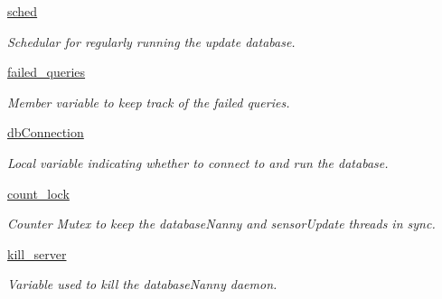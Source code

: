 \begin{DoxyCompactItemize}
\mbox{\label{class_server_app_1_1_server_app_ac135cf1405ae7df3699a2131821af81f}} 
\mbox{\hyperlink{class_server_app_1_1_server_app_ac135cf1405ae7df3699a2131821af81f}{sched}}
\begin{DoxyCompactList}\small\item\em Schedular for regularly running the update database. \end{DoxyCompactList}\item 
\mbox{\label{class_server_app_1_1_server_app_a392a723730fcdbefd0a4b96f820c9fec}} 
\mbox{\hyperlink{class_server_app_1_1_server_app_a392a723730fcdbefd0a4b96f820c9fec}{failed\+\_\+queries}}
\begin{DoxyCompactList}\small\item\em Member variable to keep track of the failed queries. \end{DoxyCompactList}\item 
\mbox{\hyperlink{class_server_app_1_1_server_app_a541e00ca3089461e9ee7f02b3a1fdea9}{db\+Connection}}
\begin{DoxyCompactList}\small\item\em Local variable indicating whether to connect to and run the database. \end{DoxyCompactList}\item 
\mbox{\label{class_server_app_1_1_server_app_a9749427986bfbdb2428bf5861b61f8c2}} 
\mbox{\hyperlink{class_server_app_1_1_server_app_a9749427986bfbdb2428bf5861b61f8c2}{count\+\_\+lock}}
\begin{DoxyCompactList}\small\item\em Counter Mutex to keep the database\+Nanny and sensor\+Update threads in sync. \end{DoxyCompactList}\item 
\mbox{\label{class_server_app_1_1_server_app_a5a9788c6453de0cb4cfc6a1f82cfa4d1}} 
\mbox{\hyperlink{class_server_app_1_1_server_app_a5a9788c6453de0cb4cfc6a1f82cfa4d1}{kill\+\_\+server}}
\begin{DoxyCompactList}\small\item\em Variable used to kill the database\+Nanny daemon. \end{DoxyCompactList}\item 
\mbox{\label{class_server_app_1_1_server_app_a108fcfaa44a437b4a2a8fede99da06ea}} 

\end{DoxyCompactItemize}
